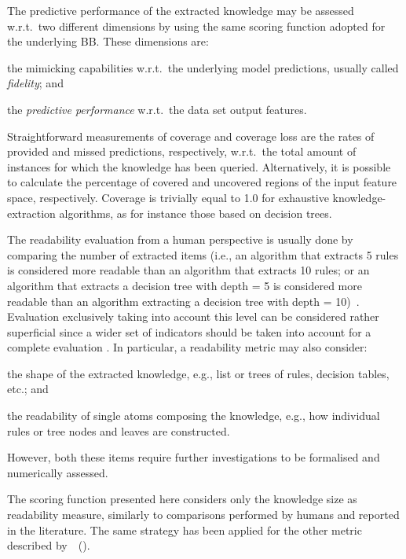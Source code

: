 \documentclass{article}
\newcommand{\citet}[1]{\citeauthor{#1}~(\citeyear{#1})}
\newenvironment{inlinelist}{\begin{enumerate*}[label=\emph{(\roman{*})}]}{\end{enumerate*}}
\begin{document}
The predictive performance of the extracted knowledge may be assessed w.r.t.\ two different dimensions by using the same scoring function adopted for the underlying BB.
%
These dimensions are:
%
\begin{inlinelist}
	\item the mimicking capabilities w.r.t.\ the underlying model predictions, usually called \emph{fidelity}; and
	\item the \emph{predictive performance} w.r.t.\ the data set output features.
\end{inlinelist}

Straightforward measurements of coverage and coverage loss are the rates of provided and missed predictions, respectively, w.r.t.\ the total amount of instances for which the knowledge has been queried.
%
Alternatively, it is possible to calculate the percentage of covered and uncovered regions of the input feature space, respectively.
%
Coverage is trivially equal to 1.0 for exhaustive knowledge-extraction algorithms, as for instance those based on decision trees.

The readability evaluation from a human perspective is usually done by comparing the number of extracted items (i.e., an algorithm that extracts 5 rules is considered more readable than an algorithm that extracts 10 rules; or an algorithm that extracts a decision tree with depth = 5 is considered more readable than an algorithm extracting a decision tree with depth = 10)~\cite{czarnowski2016}.
% 
Evaluation exclusively taking into account this level can be considered rather superficial since a wider set of indicators should be taken into account for a complete evaluation \cite{sabbatini2022-metrics}.
%
In particular, a readability metric may also consider:
%
\begin{inlinelist}
	\item the shape of the extracted knowledge, e.g., list or trees of rules, decision tables, etc.; and
	\item the readability of single atoms composing the knowledge, e.g., how individual rules or tree nodes and leaves are constructed.
\end{inlinelist}
%
However, both these items require further investigations to be formalised and numerically assessed.

The scoring function presented here considers only the knowledge size as readability measure, similarly to comparisons performed by humans and reported in the literature.
%
The same strategy has been applied for the other metric described by~\citet{skemetrics-aaai2023}.
\end{document}
